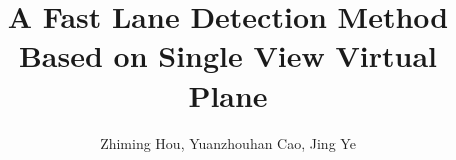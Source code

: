 \documentclass[10pt,twocolumn,letterpaper]{article}
\begin{document}
\title{A Fast Lane Detection Method Based on Single View Virtual Plane}

\author{Zhiming Hou, Yuanzhouhan Cao, Jing Ye}
\maketitle

\begin{abstract}
  
\end{abstract}











{
  \small
  
  
}
\clearpage
%
\end{document}

